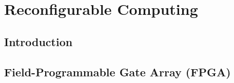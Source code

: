 \chapter{Reconfigurable Computing}
\label{ch:reconfigurableComputing}

\section{Introduction}
\label{sec:rcIntroduction}


\section{Field-Programmable Gate Array (FPGA)}
\label{sec:FPGA}


